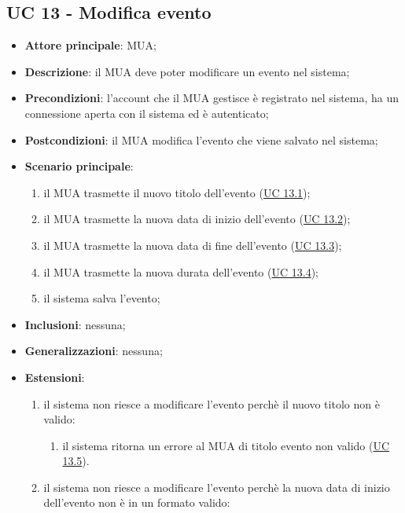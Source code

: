 \subsection{UC 13 - Modifica evento} \label{sec:UC13}
    \begin{itemize}
        \item \textbf{Attore principale}: MUA;
        \item \textbf{Descrizione}: il MUA deve poter modificare un evento nel sistema;
        \item \textbf{Precondizioni}: l’account che il MUA gestisce è registrato nel sistema, ha un connessione aperta con il sistema ed è autenticato;
        \item \textbf{Postcondizioni}: il MUA modifica l'evento che viene salvato nel sistema;
        \item \textbf{Scenario principale}:
            \begin{enumerate}
                \item il MUA trasmette il nuovo titolo dell'evento (\hyperref[sec:UC13.1]{UC 13.1});
                \item il MUA trasmette la nuova data di inizio dell'evento (\hyperref[sec:UC13.2]{UC 13.2});
                \item il MUA trasmette la nuova data di fine dell'evento (\hyperref[sec:UC13.3]{UC 13.3});
                \item il MUA trasmette la nuova durata dell'evento (\hyperref[sec:UC13.4]{UC 13.4});
                \item il sistema salva l'evento;
            \end{enumerate}
        \item \textbf{Inclusioni}: nessuna;
        \item \textbf{Generalizzazioni}: nessuna;
        \item \textbf{Estensioni}: 
        \begin{enumerate}[label=\alph*.]
            \item il sistema non riesce a modificare l'evento perchè il nuovo titolo non è valido:
            \begin{enumerate}[label=\arabic*.]
                \item il sistema ritorna un errore al MUA di titolo evento non valido (\hyperref[sec:UC13.5]{UC 13.5}).
            \end{enumerate}
            \item il sistema non riesce a modificare l'evento perchè la nuova data di inizio dell'evento non è in un formato valido:

\end{enumerate}
\end{itemize}
